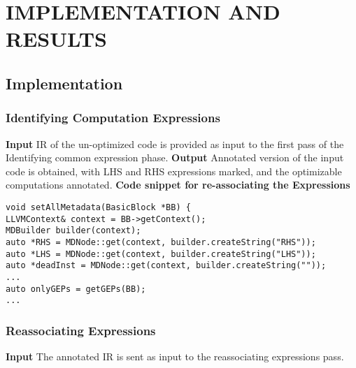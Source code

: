 
\chapter{IMPLEMENTATION AND RESULTS} %

\section{Implementation}
\subsection{Identifying Computation Expressions}
\noindent
\textbf{Input}
IR of the un-optimized code is provided as input to the first pass of the Identifying common expression phase.\newline
\hspace{35pt}\textbf{ Output}
Annotated version of the input code is obtained, with LHS and RHS expressions marked, and the optimizable computations annotated.\newline
\textbf{Code snippet for re-associating the Expressions}

\begin{lstlisting}
void setAllMetadata(BasicBlock *BB) {
LLVMContext& context = BB->getContext();
MDBuilder builder(context);
auto *RHS = MDNode::get(context, builder.createString("RHS"));
auto *LHS = MDNode::get(context, builder.createString("LHS"));
auto *deadInst = MDNode::get(context, builder.createString(""));
...
auto onlyGEPs = getGEPs(BB);
...
\end{lstlisting}
\newpage

\subsection{Reassociating Expressions}
\noindent
\textbf{Input}\newline
The annotated IR is sent as input to the reassociating expressions pass.

